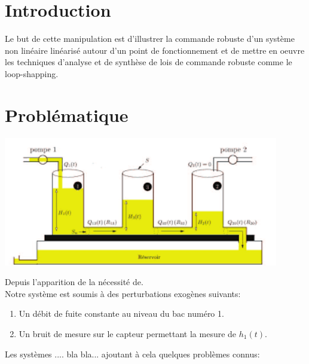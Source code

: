 \documentclass[12pt, a4paper, openany]{report}
\begin{document}
\chapter*{Introduction}
 
  Le but de cette manipulation est d'illustrer la commande robuste d'un système non linéaire linéarisé autour d'un point de fonctionnement et de mettre en oeuvre les techniques d'analyse et de synthèse de lois de commande robuste comme le loop-shapping.\\
                                                      



\chapter*{Problématique}
 
 \begin{center}
   \includegraphics[width=12cm]{index.png}
   \label{fig1}
 \end{center}   
   
   Depuis l’apparition de la nécessité de. \\
   
   Notre système est soumis à des perturbations exogènes suivants:
        
  \begin{enumerate}
      \item Un débit de fuite constante au niveau du bac numéro 1.
      \item Un bruit de mesure sur le capteur permettant la mesure de $h_{1}(t)$.
  \end{enumerate}
   
   Les systèmes .... bla bla... ajoutant à cela quelques problèmes connus:
    
\end{document}
